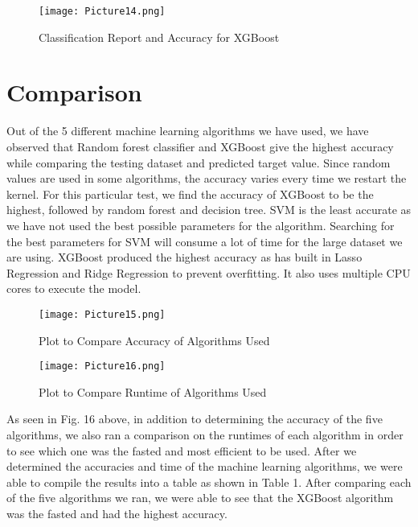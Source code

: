 \documentclass[11pt,conference]{IEEEtran}
\begin{document}
\begin{figure}[htbp]
\centerline{\texttt{[image: Picture14.png]}}
\caption{Classification Report and Accuracy for XGBoost}
\label{fig}
\end{figure}

\section{Comparison}
Out of the 5 different machine learning algorithms we have used, we have observed that Random forest classifier and XGBoost give the highest accuracy while comparing the testing dataset and predicted target value. Since random values are used in some algorithms, the accuracy varies every time we restart the kernel. For this particular test, we find the accuracy of XGBoost to be the highest, followed by random forest and decision tree. SVM is the least accurate as we have not used the best possible parameters for the algorithm. Searching for the best parameters for SVM will consume a lot of time for the large dataset we are using. XGBoost produced the highest accuracy as has built in Lasso Regression and Ridge Regression to prevent overfitting. It also uses multiple CPU cores to execute the model.

\begin{figure}[htbp]
\centerline{\texttt{[image: Picture15.png]}}
\caption{Plot to Compare Accuracy of Algorithms Used}
\label{fig}
\end{figure}

\begin{figure}[htbp]
\centerline{\texttt{[image: Picture16.png]}}
\caption{Plot to Compare Runtime of Algorithms Used}
\label{fig}
\end{figure}

As seen in Fig. 16 above, in addition to determining the accuracy of the five algorithms, we also ran a comparison on the runtimes of each algorithm in order to see which one was the fasted and most efficient to be used. After we determined the accuracies and time of the machine learning algorithms, we were able to compile the results into a table as shown in Table 1. After comparing each of the five algorithms we ran, we were able to see that the XGBoost algorithm was the fasted and had the highest accuracy.
\end{document}
